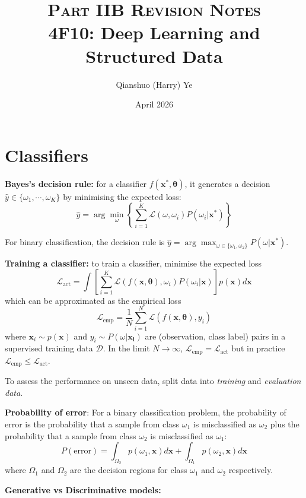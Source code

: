 \documentclass[12pt]{article}
\title{
    {\scshape  Part IIB Revision Notes} \\ 
    \vspace{0.5em}
    \textbf{4F10: Deep Learning and Structured Data}}
\author{Qianshuo (Harry) Ye}
\date{April 2026}
\begin{document}
\maketitle

\section{Classifiers}
\textbf{Bayes's decision rule:} for a classifier $f(\boldsymbol{x^*}, \boldsymbol{\theta})$, it generates a decision $\hat{y} \in \{\omega_1, \cdots, \omega_K\}$ by minimising the expected loss:
$$
\hat{y} = \arg\min_{\omega}\left\{\sum_{i=1}^K \mathcal{L}(\omega, \omega_i)P(\omega_i | \boldsymbol{x^*})\right\}
$$

For binary classification, the decision rule is $\hat{y} = \arg\max_{\omega \in \{\omega_1, \omega_2\}} P(\omega | \boldsymbol{x^*})$.

\textbf{Training a classifier:} to train a classifier, minimise the expected loss
$$
\mathcal{L}_\text{act} = \int \left[\sum_{i=1}^{K}\mathcal{L}(f(\boldsymbol{x}, \boldsymbol{\theta}), \omega_i) P(\omega_i | \boldsymbol{x}) \right] p(\boldsymbol{x}) d\boldsymbol{x}
$$
which can be approximated as the empirical loss
$$
\mathcal{L}_\text{emp} = \frac{1}{N}\sum_{i=1}^N \mathcal{L}(f(\boldsymbol{x}, \boldsymbol{\theta}), y_i)
$$
where $\boldsymbol{x}_i \sim p(\boldsymbol{x})$ and $y_i \sim P(\omega | \boldsymbol{x_i})$ are (observation, class label) pairs in a supervised training data $\mathcal{D}$. In the limit $N \to \infty$, $\mathcal{L}_\text{emp} = \mathcal{L}_\text{act}$ but in practice $\mathcal{L}_\text{emp} \leq \mathcal{L}_\text{act}$.

To assess the performance on unseen data, split data into \textit{training} and \textit{evaluation data}.

\textbf{Probability of error}: For a binary classification problem, the probability of error is the probability that a sample from class $\omega_1$ is misclassified as $\omega_2$ plus the probability that a sample from class $\omega_2$ is misclassified as $\omega_1$:
$$
P(\text{error}) = \int_{\Omega_2} p(\omega_1, \boldsymbol{x})d\boldsymbol{x} + \int_{\Omega_1} p(\omega_2, \boldsymbol{x}) d \boldsymbol{x}
$$
where $\Omega_1$ and $\Omega_2$ are the decision regions for class $\omega_1$ and $\omega_2$ respectively.

\textbf{Generative vs Discriminative models:} 
\end{document}
